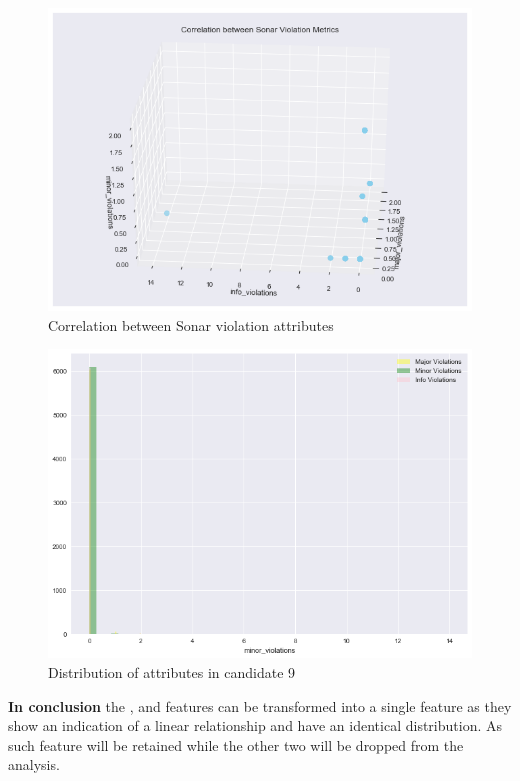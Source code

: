 \begin{enumerate}
\begin{figure}[!h]
    \centering
    \includegraphics[scale=0.6]{Figures/three-d/Correlation_between_attributes_major_violations_info_violations_minor_violations.png}
    \caption{Correlation between Sonar violation attributes}
    \label{fig:3d:candidate9-relationship}
\end{figure}

\begin{figure}
    \centering
    \includegraphics[scale=0.6]{Figures/correlation/Attribute_Distribution_in_Candidate_9.png}
    \caption{Distribution of attributes in candidate 9}
    \label{fig:candidate9-distribution}
\end{figure}

\textbf{In conclusion} the \openIssues{}, \codeSmells{} and \violations{} features can be transformed into a single feature as they show an indication of a linear relationship and have an identical distribution. As such \violations{} feature will be retained while the other two will be dropped from the analysis.


\end{enumerate}
